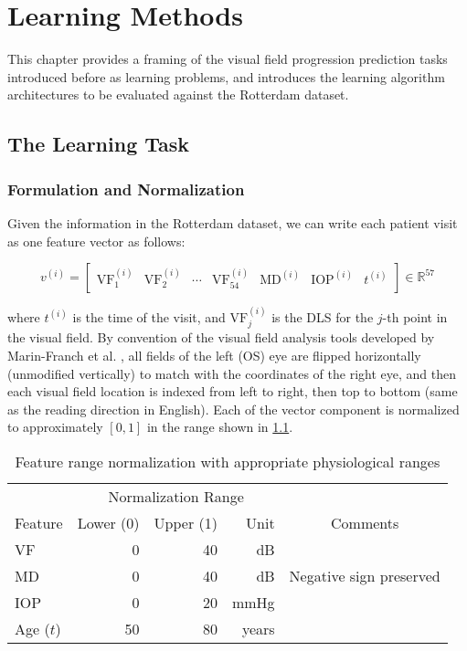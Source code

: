 \chapter{Learning Methods} \label{chapter:methods}

This chapter provides a framing of the visual field progression prediction tasks introduced before as learning problems, and introduces the learning algorithm architectures to be evaluated against the Rotterdam dataset. 

\section{The Learning Task}

\subsection{Formulation and Normalization}

Given the information in the Rotterdam dataset, we can write each patient visit as one feature vector as follows:

\begin{equation}
v^{(i)} = \begin{bmatrix}
\textrm{VF}^{(i)}_1 & 
\textrm{VF}^{(i)}_2 & 
\cdots & 
\textrm{VF}^{(i)}_{54} & 
\textrm{MD}^{(i)} & 
\textrm{IOP}^{(i)} & 
t^{(i)}
\end{bmatrix}
\in \mathbb{R}^{57}
\end{equation}

where $t^{(i)}$ is the time of the visit, and $\textrm{VF}^{(i)}_j$ is the \ac{DLS} for the $j$-th point in the visual field. By convention of the visual field analysis tools developed by Marin-Franch et al. \cite{Marin-Franch2013}, all fields of the left (OS) eye are flipped horizontally (unmodified vertically) to match with the coordinates of the right eye, and then each visual field location is indexed from left to right, then top to bottom (same as the reading direction in English). Each of the vector component is normalized to approximately $[0, 1]$ in the range shown in \cref{tab:norm}.

\begin{table}[h]
\centering
\caption{Feature range normalization with appropriate physiological ranges}
\begin{tabular}{@{}lrrrc@{}}
\toprule
 & \multicolumn{3}{c}{Normalization Range} & \\
\cmidrule{2-4}
Feature & Lower (0) & Upper (1) & Unit & Comments \\ 
\midrule
VF & 0 & 40 & dB &  \\
MD & 0 & 40 & dB & Negative sign preserved \\
IOP & 0 & 20 & mmHg &  \\
Age ($t$) & 50 & 80 & years &  \\ 
\bottomrule
\end{tabular}
\label{tab:norm}
\end{table}

